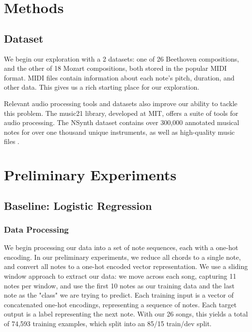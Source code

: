 \documentclass[twoside,twocolumn]{article}
\begin{document}

\section{Methods}

\subsection{Dataset}

We begin our exploration with a 2 datasets: one of 26 Beethoven compositions, and the other of 18 Mozart compositions, both stored in the popular MIDI format. MIDI files contain information about each note's pitch, duration, and other data. This gives us a rich starting place for our exploration.

Relevant audio processing tools and datasets also improve our ability to tackle this problem. The music21 library, developed at MIT, offers a suite of tools for audio processing. The NSynth dataset contains over 300,000 annotated musical notes for over one thousand unique instruments, as well as high-quality music files \cite{NSynth}.


\section{Preliminary Experiments}

\subsection{Baseline: Logistic Regression}

\subsubsection{Data Processing}
We begin processing our data into a set of note sequences, each with a one-hot encoding. In our preliminary experiments, we reduce all chords to a single note, and convert all notes to a one-hot encoded vector representation. We use a sliding window approach to extract our data: we move across each song, capturing 11 notes per window, and use the first 10 notes as our training data and the last note as the "class" we are trying to predict. Each training input is a vector of concatenated one-hot encodings, representing a sequence of notes. Each target output is a label representing the next note. With our 26 songs, this yields a total of 74,593 training examples, which split into an 85/15 train/dev split.
\end{document}
